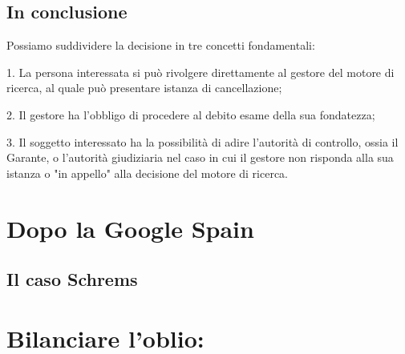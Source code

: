 \subsection{In conclusione}
Possiamo suddividere la decisione in tre concetti fondamentali:

1. La persona interessata si può rivolgere direttamente al gestore del motore di ricerca, al quale può presentare istanza di cancellazione;

2. Il gestore ha l'obbligo di procedere al debito esame della sua fondatezza;

3. Il soggetto interessato ha la possibilità di adire l'autorità di controllo, ossia il Garante, o l'autorità giudiziaria nel caso in cui il gestore non risponda alla sua istanza o "in appello" alla decisione del motore di ricerca.
\section{Dopo la Google Spain}
\subsection{Il caso Schrems}

\section{Bilanciare l'oblio:}
